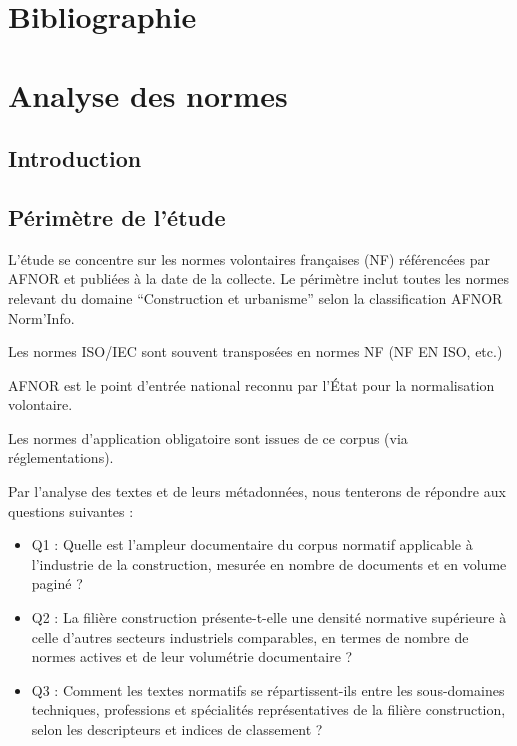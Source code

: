 \documentclass[a4paper,12pt]{article}
\begin{document}
\clearpage
\section{Bibliographie}
\label{sec:org1ee654c}
\printbibliography[heading=none]

\clearpage

\appendix
\section{Analyse des normes}
\label{sec:org67a4ae0}
\subsection{Introduction}
\label{sec:org6ed7d08}
\subsection{Périmètre de l'étude}
\label{sec:orgf9a52bb}
L’étude se concentre sur les normes volontaires françaises (NF) référencées par AFNOR et publiées à la date de la collecte.
Le périmètre inclut toutes les normes relevant du domaine “Construction et urbanisme” selon la classification AFNOR Norm’Info.

Les normes ISO/IEC sont souvent transposées en normes NF (NF EN ISO, etc.)

AFNOR est le point d’entrée national reconnu par l’État pour la normalisation volontaire.

Les normes d’application obligatoire sont issues de ce corpus (via réglementations).

Par l'analyse des textes et de leurs métadonnées, nous tenterons de répondre aux questions suivantes :

\begin{itemize}
\item Q1 : Quelle est l’ampleur documentaire du corpus normatif applicable à l’industrie de la construction, mesurée en nombre de documents et en volume paginé ?
\item Q2 : La filière construction présente-t-elle une densité normative supérieure à celle d’autres secteurs industriels comparables, en termes de nombre de normes actives et de leur volumétrie documentaire ?
\item Q3 : Comment les textes normatifs se répartissent-ils entre les sous-domaines techniques, professions et spécialités représentatives de la filière construction, selon les descripteurs et indices de classement ?
\end{itemize}
\end{document}
